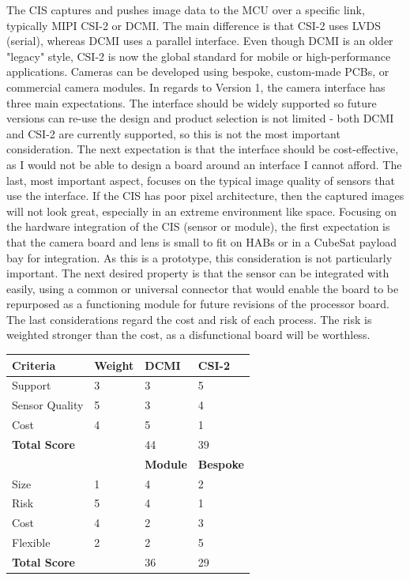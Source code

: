 The CIS captures and pushes image data to the MCU over a specific link, typically MIPI CSI-2 or DCMI. The main difference is that CSI-2 uses LVDS (serial), whereas DCMI uses a parallel interface. Even though DCMI is an older "legacy" style, CSI-2 is now the global standard for mobile or high-performance applications. Cameras can be developed using bespoke, custom-made PCBs, or commercial camera modules.
\nl
In regards to Version 1, the camera interface has three main expectations. The interface should be widely supported so future versions can re-use the design and product selection is not limited - both DCMI and CSI-2 are currently supported, so this is not the most important consideration. The next expectation is that the interface should be cost-effective, as I would not be able to design a board around an interface I cannot afford. The last, most important aspect, focuses on the typical image quality of sensors that use the interface. If the CIS has poor pixel architecture, then the captured images will not look great, especially in an extreme environment like space.
\nl
Focusing on the hardware integration of the CIS (sensor or module), the first expectation is that the camera board and lens is small to fit on HABs or in a CubeSat payload bay for integration. As this is a prototype, this consideration is not particularly important. The next desired property is that the sensor can be integrated with easily, using a common or universal connector that would enable the board to be repurposed as a functioning module for future revisions of the processor board. The last considerations regard the cost and risk of each process. The risk is weighted stronger than the cost, as a disfunctional board will be worthless.

\begin{indentedtable}   
    \centering
        \begin{tabular}{|l|l|l|l|}
        \hline
        \textbf{Criteria} & \textbf{Weight} & \textbf{DCMI} & \textbf{CSI-2} \\
        \hline
        Support & 3 & 3 & 5 \\
        \hline
        Sensor Quality & 5 & 3 & 4 \\
        \hline
        Cost & 4 & 5 & 1 \\
        \hline
        \hline
        \textbf{Total Score} &  & 44 & 39 \\
        \hline
        \hline
        \textbf{} & \textbf{} & \textbf{Module} & \textbf{Bespoke} \\
        \hline
        Size & 1 & 4 & 2 \\
        \hline
        Risk & 5 & 4 & 1 \\
        \hline
        Cost & 4 & 2 & 3 \\
        \hline
        Flexible & 2 & 2 & 5 \\
        \hline
        \hline
        \textbf{Total Score} &  & 36 & 29 \\
        \hline
    \end{tabular}
    
    \caption{C2Sv1 CIS trade study.}
    \label{tab:v1-trade-cis}
\end{indentedtable}

